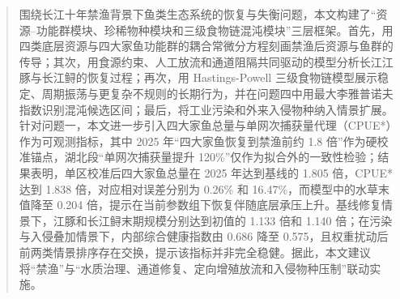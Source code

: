 \documentclass{MMCStyle}
\begin{document}
\begin{abstract}
围绕长江十年禁渔背景下鱼类生态系统的恢复与失衡问题，本文构建了“资源--功能群模块、珍稀物种模块和三级食物链混沌模块”三层框架。首先，用四类底层资源与四大家鱼功能群的耦合常微分方程刻画禁渔后资源与鱼群的传导；其次，用食源约束、人工放流和通道阻隔共同驱动的模型分析长江江豚与长江鲟的恢复过程；再次，用 Hastings-Powell 三级食物链模型展示稳定、周期振荡与更复杂不规则的长期行为，并在问题四中用最大李雅普诺夫指数识别混沌候选区间；最后，将工业污染和外来入侵物种纳入情景扩展。针对问题一，本文进一步引入四大家鱼总量与单网次捕获量代理（CPUE*）作为可观测指标，其中 2025 年“四大家鱼恢复到禁渔前约 1.8 倍”作为硬校准锚点，湖北段“单网次捕获量提升 120\%”仅作为拟合外的一致性检验；结果表明，单区校准后四大家鱼总量在 2025 年达到基线的 1.805 倍，CPUE* 达到 1.838 倍，对应相对误差分别为 0.26\% 和 16.47\%，而模型中的水草末值降至 0.204 倍，提示在当前参数组下恢复伴随底层承压上升。基线修复情景下，江豚和长江鲟末期规模分别达到初值的 1.133 倍和 1.140 倍；在污染与入侵叠加情景下，内部综合健康指数由 0.686 降至 0.575，且权重扰动后前两类情景排序存在交换，提示该指标并非完全稳健。据此，本文建议将“禁渔”与“水质治理、通道修复、定向增殖放流和入侵物种压制”联动实施。
\end{abstract}

\newpage
\tableofcontents
\newpage
{}
\pagestyle{fancy}
\end{document}
